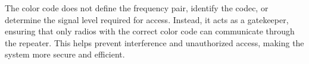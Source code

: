 The color code does not define the frequency pair, identify the codec, or determine the signal level required for access. Instead, it acts as a gatekeeper, ensuring that only radios with the correct color code can communicate through the repeater. This helps prevent interference and unauthorized access, making the system more secure and efficient.

